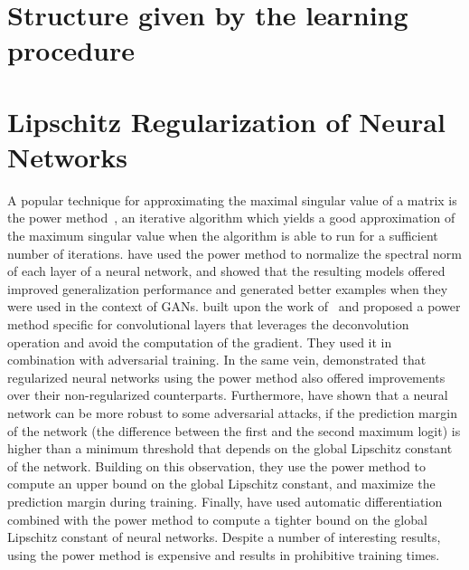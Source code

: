 \section{Structure given by the learning procedure}
\label{section:ch2-xxx}


\section{Lipschitz Regularization of Neural Networks}
\label{section:ch5-related_work}

A popular technique for approximating the maximal singular value of a matrix is the power method~\cite{golub2000eigenvalue}, an iterative algorithm which yields a good approximation of the maximum singular value when the algorithm is able to run for a sufficient number of iterations. 
\citet{yoshida2017spectral, miyato2018spectral} have used the power method to normalize the spectral norm of each layer of a neural network, and showed that the resulting models offered improved generalization performance and generated better examples when they were used in the context of GANs. 
\citet{farnia2018generalizable} built upon the work of~\citet{miyato2018spectral} and proposed a power method specific for convolutional layers that leverages the deconvolution operation and avoid the computation of the gradient.
They used it in combination with adversarial training. 
In the same vein, \citet{gouk2018regularisation} demonstrated that regularized neural networks using the power method also offered improvements over their non-regularized counterparts. 
Furthermore, \citet{tsuzuku2018lipschitz} have shown that a neural network can be more robust to some adversarial attacks, if the prediction margin of the network (\ie the difference between the first and the second maximum logit) is higher than a minimum threshold that depends on the global Lipschitz constant of the network.
Building on this observation, they use the power method to compute an upper bound on the global Lipschitz constant, and maximize the prediction margin during training.
Finally, \citet{scaman2018lipschitz} have used automatic differentiation combined with the power method to compute a tighter bound on the global Lipschitz constant of neural networks.
Despite a number of interesting results, using the power method is expensive and results in prohibitive training times. 

